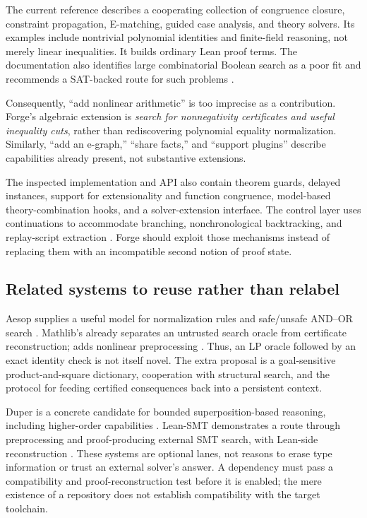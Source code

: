 The current reference describes a cooperating collection of congruence closure,
constraint propagation, E-matching, guided case analysis, and theory solvers.
Its examples include nontrivial polynomial identities and finite-field
reasoning, not merely linear inequalities. It builds ordinary Lean proof
terms. The documentation also identifies large combinatorial Boolean search
as a poor fit and recommends a SAT-backed route for such problems
\cite{lean-grind}.

Consequently, ``add nonlinear arithmetic'' is too imprecise as a contribution.
Forge's algebraic extension is \emph{search for nonnegativity certificates and
useful inequality cuts}, rather than rediscovering polynomial equality
normalization. Similarly, ``add an e-graph,'' ``share facts,'' and ``support
plugins'' describe capabilities already present, not substantive extensions.

The inspected implementation and API also contain theorem guards, delayed
instances, support for extensionality and function congruence,
model-based theory-combination hooks, and a solver-extension interface.
The  control layer uses continuations to accommodate branching,
nonchronological backtracking, and replay-script extraction
\cite{grind-types,grind-action}. Forge should exploit those mechanisms instead
of replacing them with an incompatible second notion of proof state.

\subsection{Related systems to reuse rather than relabel}

Aesop supplies a useful model for normalization rules and safe/unsafe
AND--OR search \cite{aesop}. Mathlib's  already separates an
untrusted search oracle from certificate reconstruction; 
adds nonlinear preprocessing \cite{linarith}. Thus, an LP oracle followed by an
exact identity check is not itself novel. The extra proposal is a goal-sensitive
product-and-square dictionary, cooperation with structural search, and the
protocol for feeding certified consequences back into a persistent context.

Duper is a concrete candidate for bounded superposition-based reasoning,
including higher-order capabilities \cite{duper}. Lean-SMT demonstrates a
route through preprocessing and proof-producing external SMT search, with
Lean-side reconstruction \cite{lean-smt}. These systems are optional lanes,
not reasons to erase type information or trust an external solver's answer.
A dependency must pass a compatibility and proof-reconstruction test before it
is enabled; the mere existence of a repository does not establish compatibility
with the target toolchain.

